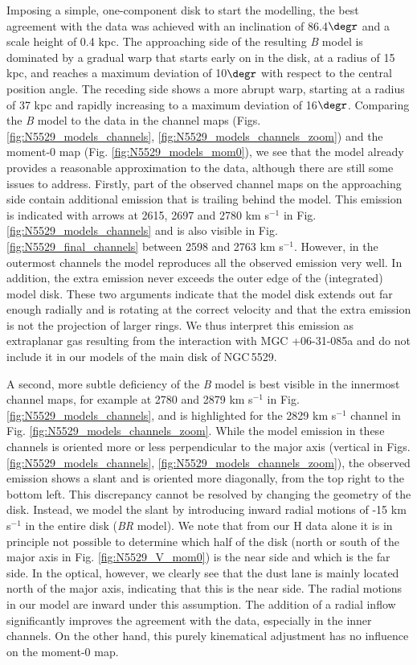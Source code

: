 \documentclass{aa}
\begin{document}
Imposing a simple, one-component disk to start the modelling, the best agreement with the data was achieved with an inclination of 86.4$\degr$ and a scale height of 0.4 kpc. The approaching side of the resulting \emph{B} model is dominated by a gradual warp that starts early on in the disk, at a radius of 15 kpc, and reaches a maximum deviation of 10$\degr$ with respect to the central position angle. The receding side shows a more abrupt warp, starting at a radius of 37 kpc and rapidly increasing to a maximum deviation of 16$\degr$. Comparing the \textit{B} model to the data in the channel maps (Figs. \ref{fig:N5529_models_channels}, \ref{fig:N5529_models_channels_zoom}) and the moment-0 map (Fig. \ref{fig:N5529_models_mom0}), we see that the model already provides a reasonable approximation to the data, although there are still some issues to address. Firstly, part of the observed channel maps on the approaching side contain additional emission that is trailing behind the model. This emission is indicated with arrows at 2615, 2697 and 2780 km s$^{-1}$ in Fig. \ref{fig:N5529_models_channels} and is also visible in Fig. \ref{fig:N5529_final_channels} between 2598 and 2763 km s$^{-1}$. However, in the outermost channels the model reproduces all the observed emission very well. In addition, the extra emission never exceeds the outer edge of the (integrated) model disk. These two arguments indicate that the model disk extends out far enough radially and is rotating at the correct velocity and that the extra emission is not the projection of larger rings. We thus interpret this emission as extraplanar gas resulting from the interaction with MGC +06-31-085a and do not include it in our models of the main disk of NGC\,5529.
\par
A second, more subtle deficiency of the \emph{B} model is best visible in the innermost channel maps, for example at 2780 and 2879 km s$^{-1}$ in Fig. \ref{fig:N5529_models_channels}, and is highlighted for the 2829 km s$^{-1}$ channel in Fig. \ref{fig:N5529_models_channels_zoom}. While the model emission in these channels is oriented more or less perpendicular to the major axis (vertical in Figs. \ref{fig:N5529_models_channels}, \ref{fig:N5529_models_channels_zoom}), the observed emission shows a slant and is oriented more diagonally, from the top right to the bottom left. This discrepancy cannot be resolved by changing the geometry of the disk. Instead, we model the slant by introducing inward radial motions of -15 km s$^{-1}$ in the entire disk (\emph{BR} model). We note that from our H{} data alone it is in principle not possible to determine which half of the disk (north or south of the major axis in Fig. \ref{fig:N5529_V_mom0}) is the near side and which is the far side. In the optical, however, we clearly see that the dust lane is mainly located north of the major axis, indicating that this is the near side. The radial motions in our model are inward under this assumption. The addition of a radial inflow significantly improves the agreement with the data, especially in the inner channels. On the other hand, this purely kinematical adjustment has no influence on the moment-0 map.
\end{document}

